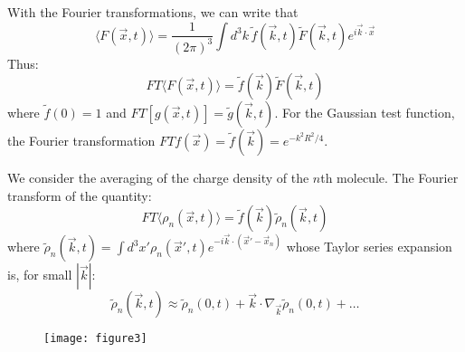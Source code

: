 \documentclass{article}
\begin{document}
	With the Fourier transformations, we can write that
	\begin{equation}
		\langle F(\vec{x},t) \rangle = \frac{1}{(2\pi)^3} \int d^3k \, \tilde{f}(\vec{k},t) \tilde{F}(\vec{k},t) e^{i\vec{k}\cdot\vec{x}}
	\end{equation}
	Thus:
	\begin{equation}
		FT\langle F(\vec{x},t) \rangle = \tilde{f}(\vec{k}) \tilde{F}(\vec{k},t)
	\end{equation}
	where $\tilde{f}(0)=1$ and $FT[g(\vec{x},t)] = \tilde{g}(\vec{k},t)$. For the Gaussian test function, the Fourier transformation $FT f(\vec{x}) = \tilde{f}(\vec{k}) = e^{-k^2R^2/4}$.
	
	We consider the averaging of the charge density of the $n$th molecule. The Fourier transform of the quantity:
	\begin{equation}
		FT \langle \rho_n(\vec{x},t) \rangle = \tilde{f}(\vec{k}) \tilde{\rho}_n(\vec{k},t)
	\end{equation}
	where $\tilde{\rho}_n(\vec{k},t) = \int d^3x' \rho_n(\vec{x}',t) e^{-i\vec{k}\cdot(\vec{x}'-\vec{x}_n)}$ whose Taylor series expansion is, for small $|\vec{k}|$:
	\begin{equation}
		\tilde{\rho}_n(\vec{k},t) \approx \tilde{\rho}_n(0,t) + \vec{k} \cdot \nabla_{\vec{k}} \tilde{\rho}_n(0,t) + \dots
	\end{equation}
	
	\begin{figure}[h]
		\centering
		\texttt{[image: figure3]}
		\caption{}
		\label{fig:figure3}
	\end{figure}
	
\end{document}
